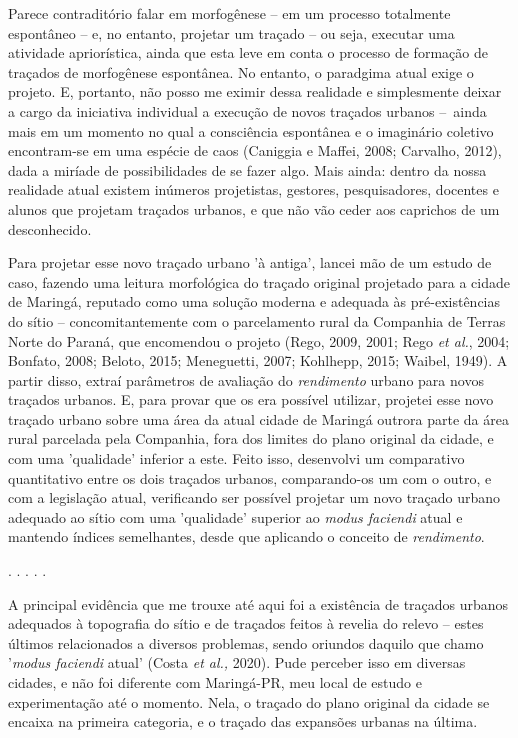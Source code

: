 \documentclass[]{report}
\begin{document}
	Parece contraditório falar em morfogênese – em um processo totalmente espontâneo – e, no entanto, projetar um traçado – ou seja, executar uma atividade apriorística, ainda que esta leve em conta o processo de formação de traçados de morfogênese espontânea. No entanto, o paradgima atual exige o projeto. E, portanto, não posso me eximir dessa realidade e simplesmente deixar a cargo da iniciativa individual a execução de novos traçados urbanos – ainda mais em um momento no qual a consciência espontânea e o imaginário coletivo encontram-se em uma espécie de caos (Caniggia e Maffei, 2008; Carvalho, 2012), dada a miríade de possibilidades de se fazer algo. Mais ainda: dentro da nossa realidade atual existem inúmeros projetistas, gestores, pesquisadores, docentes e alunos que projetam traçados urbanos, e que não vão ceder aos caprichos de um desconhecido.

	Para projetar esse novo traçado urbano 'à antiga', lancei mão de um estudo de caso, fazendo uma leitura morfológica do traçado original projetado para a cidade de Maringá, reputado como uma solução moderna e adequada às pré-existências do sítio – concomitantemente com o parcelamento rural da Companhia de Terras Norte do Paraná, que encomendou o projeto (Rego, 2009, 2001; Rego \textit{et al.}, 2004; Bonfato, 2008; Beloto, 2015; Meneguetti, 2007; Kohlhepp, 2015; Waibel, 1949). A partir disso, extraí parâmetros de avaliação do \textit{rendimento} urbano para novos traçados urbanos. E, para provar que os era possível utilizar, projetei esse novo traçado urbano sobre uma área da atual cidade de Maringá outrora parte da área rural parcelada pela Companhia, fora dos limites do plano original da cidade, e com uma 'qualidade' inferior a este. Feito isso, desenvolvi um comparativo quantitativo entre os dois traçados urbanos, comparando-os um com o outro, e com a legislação atual, verificando ser possível projetar um novo traçado urbano adequado ao sítio com uma 'qualidade' superior ao \textit{modus faciendi} atual e mantendo índices semelhantes, desde que aplicando o conceito de \textit{rendimento}.

	\begin{center}
		. . . . .
	\end{center}

	A principal evidência que me trouxe até aqui foi a existência de traçados urbanos adequados à topografia do sítio e de traçados feitos à revelia do relevo – estes últimos relacionados a diversos problemas, sendo oriundos daquilo que chamo '\textit{modus faciendi} atual' (Costa \textit{et al.,} 2020). Pude perceber isso em diversas cidades, e não foi diferente com Maringá-PR, meu local de estudo e experimentação até o momento. Nela, o traçado do plano original da cidade se encaixa na primeira categoria, e o traçado das expansões urbanas na última. 
\end{document}
